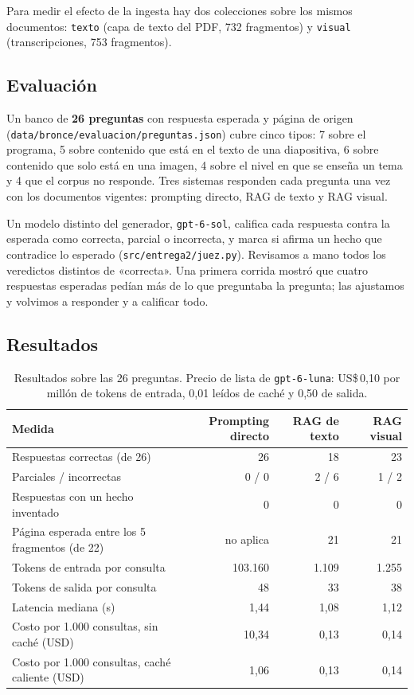 \documentclass[11pt,letterpaper]{article}
\newcommand{\cod}[1]{\texttt{\small #1}}
\begin{document}
Para medir el efecto de la ingesta hay dos colecciones sobre los mismos documentos: \cod{texto} (capa de texto del PDF, 732 fragmentos) y \cod{visual} (transcripciones, 753 fragmentos).

\subsection{Evaluación}

Un banco de \textbf{26 preguntas} con respuesta esperada y página de origen (\cod{data/\allowbreak{}bronce/\allowbreak{}evaluacion/\allowbreak{}preguntas.json}) cubre cinco tipos: 7 sobre el programa, 5 sobre contenido que está en el texto de una diapositiva, 6 sobre contenido que solo está en una imagen, 4 sobre el nivel en que se enseña un tema y 4 que el corpus no responde. Tres sistemas responden cada pregunta una vez con los documentos vigentes: prompting directo, RAG de texto y RAG visual.

Un modelo distinto del generador, \cod{gpt-6-sol}, califica cada respuesta contra la esperada como correcta, parcial o incorrecta, y marca si afirma un hecho que contradice lo esperado (\cod{src/entrega2/juez.py}). Revisamos a mano todos los veredictos distintos de «correcta». Una primera corrida mostró que cuatro respuestas esperadas pedían más de lo que preguntaba la pregunta; las ajustamos y volvimos a responder y a calificar todo.

\subsection{Resultados}

\begin{table}[H]\small\renewcommand{\arraystretch}{1.15}\centering
\begin{tabular}{lrrr}
\toprule
\textbf{Medida} & \textbf{Prompting directo} & \textbf{RAG de texto} & \textbf{RAG visual} \\
\midrule
Respuestas correctas (de 26) & 26 & 18 & 23 \\
Parciales / incorrectas & 0 / 0 & 2 / 6 & 1 / 2 \\
Respuestas con un hecho inventado & 0 & 0 & 0 \\
Página esperada entre los 5 fragmentos (de 22) & no aplica & 21 & 21 \\
Tokens de entrada por consulta & 103.160 & 1.109 & 1.255 \\
Tokens de salida por consulta & 48 & 33 & 38 \\
Latencia mediana (s) & 1,44 & 1,08 & 1,12 \\
Costo por 1.000 consultas, sin caché (USD) & 10,34 & 0,13 & 0,14 \\
Costo por 1.000 consultas, caché caliente (USD) & 1,06 & 0,13 & 0,14 \\
\bottomrule
\end{tabular}
\caption{Resultados sobre las 26 preguntas. Precio de lista de \cod{gpt-6-luna}: US\$\,0,10 por millón de tokens de entrada, 0,01 leídos de caché y 0,50 de salida.}
\label{tab:resultados}
\end{table}
\end{document}
